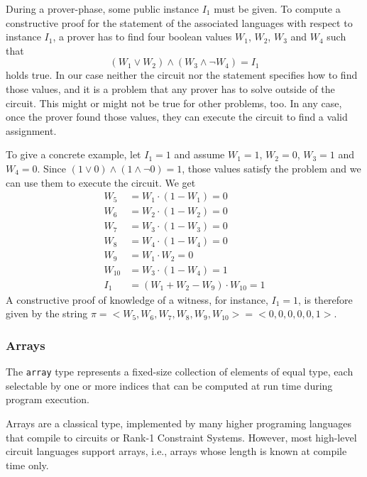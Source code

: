 \begin{example}
During a prover-phase, some public instance $I_1$ must be given. To compute a constructive proof for the statement of the associated languages with respect to instance $I_1$, a prover has to find four boolean values $W_1$, $W_2$, $W_3$ and $W_4$ such that 
$$
\left( W_1 \vee W_2 \right) \wedge (W_3 \wedge \lnot W_4) = I_1
$$ 
holds true. In our case neither the circuit nor the  statement specifies how to find those values, and it is a problem that any prover has to solve outside of the circuit. This might or might not be true for other problems, too. In any case, once the prover found those values, they can execute the circuit to find a valid assignment. 

To give a concrete example, let $I_1=1$ and assume $W_1=1$, $W_2=0$, $W_3=1$ and $W_4=0$. Since 
$\left( 1 \vee 0 \right) \wedge (1 \wedge \lnot 0) = 1$, those values satisfy the problem and we can use them to execute the circuit. We get 
\begin{align*}
W_5 & = W_1 \cdot (1- W_1) = 0\\
W_6 & = W_2 \cdot (1- W_2) = 0 \\
W_7 & = W_3 \cdot (1- W_3) = 0 \\
W_8 & = W_4 \cdot (1- W_4) = 0 \\
W_9 & = W_1\cdot W_2 = 0\\
W_{10} & = W_3 \cdot (1-W_4) = 1\\
I_1 & = (W_1 + W_2 - W_9) \cdot W_{10} = 1
\end{align*}
A constructive proof of knowledge of a witness, for instance, $I_1=1$, is therefore given by the string $\pi=<W_5,W_6,W_7,W_8,W_9,W_{10}>=<0,0,0,0,0,1>$. 
\end{example}
\subsubsection{Arrays} The \texttt{array} type represents a fixed-size collection of elements of equal type, each selectable by one or more indices that can be computed at run time during program execution. 

Arrays are a classical type, implemented by many higher programing languages that compile to circuits or Rank-1 Constraint Systems. However, most high-level circuit languages support  arrays, i.e., arrays whose length is known at compile time only. 

